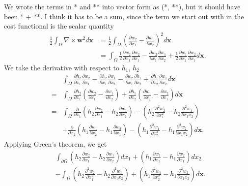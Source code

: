\documentclass[11pt, a4paper]{article}
\theoremstyle{definition}
\newcommand{\w}{\mathbf{w}}
\newcommand{\x}{\mathbf{x}}
\begin{document}
We wrote the terms in * and ** into vector form as (*, **), but it should have been * + **. I think it has to be a sum, since the term we start out with in the cost functional is the scalar quantity
	\begin{align*}
		\frac{1}{2} \int_\Omega \nabla \times \w ^2 d\x &= \frac{1}{2} \int_\Omega \left(\frac{\partial w_2}{\partial x_1} - \frac{\partial w_1}{\partial x_2}\right)^2 d\x\\
		&= \int_\Omega \frac{1}{2} \frac{\partial w_2}{\partial x_1}\frac{\partial w_2}{\partial x_1} - \frac{\partial w_2}{\partial x_1}\frac{\partial w_1}{\partial x_2} + \frac{1}{2}\frac{\partial w_1}{\partial x_2}\frac{\partial w_2}{\partial x_1} d\x.
	\end{align*}
	We take the derivative with respect to $h_1$, $h_2$
	\begin{align*}
	 &\int_\Omega  \frac{\partial h_2}{\partial x_1}\frac{\partial w_2}{\partial x_1} - \frac{\partial h_2}{\partial x_1}\frac{\partial w_1}{\partial x_2} - \frac{\partial w_2}{\partial x_1}\frac{\partial h_1}{\partial x_2}+ \frac{\partial h_1}{\partial x_2}\frac{\partial w_1}{\partial x_2} d\x \\
	 =&\int_\Omega \frac{\partial h_2}{\partial x_1} \left(\frac{\partial w_2}{\partial x_1} - \frac{\partial w_1}{\partial x_2} \right) + \frac{\partial h_1}{\partial x_2}\left(\frac{\partial w_1}{\partial x_2} - \frac{\partial w_2}{\partial x_1} \right) d\x\\
	 =& \int_\Omega \frac{\partial}{\partial x_1}\left(h_2\frac{\partial w_2}{\partial x_1} - h_2\frac{\partial w_1}{\partial x_2} \right) - \left(h_2\frac{\partial^2 w_2}{\partial x_1^2} - h_2\frac{\partial^2 w_1}{\partial x_1 x_2} \right)\\
	 & + \frac{\partial}{\partial x_2}\left(h_1\frac{\partial w_1}{\partial x_2} - h_1\frac{\partial w_2}{\partial x_1} \right) - \left(h_1\frac{\partial^2 w_1}{\partial x_2^2} - h_1\frac{\partial^2 w_2}{\partial x_1 x_2} \right) d\x.
	\end{align*}
	Applying Green's theorem, we get
	\begin{align*}
		&\int_{\partial \Omega}\left(h_2\frac{\partial w_2}{\partial x_1} - h_2\frac{\partial w_1}{\partial x_2} \right) dx_1 + \left(h_1\frac{\partial w_1}{\partial x_2} - h_1\frac{\partial w_2}{\partial x_1} \right)dx_2\\
		&- \int_\Omega \left(h_2\frac{\partial^2 w_2}{\partial x_1^2} - h_2\frac{\partial^2 w_1}{\partial x_1 x_2} \right) + \left(h_1\frac{\partial^2 w_1}{\partial x_2^2} - h_1\frac{\partial^2 w_2}{\partial x_1 x_2} \right)  d\x.
	\end{align*}
\end{document}
